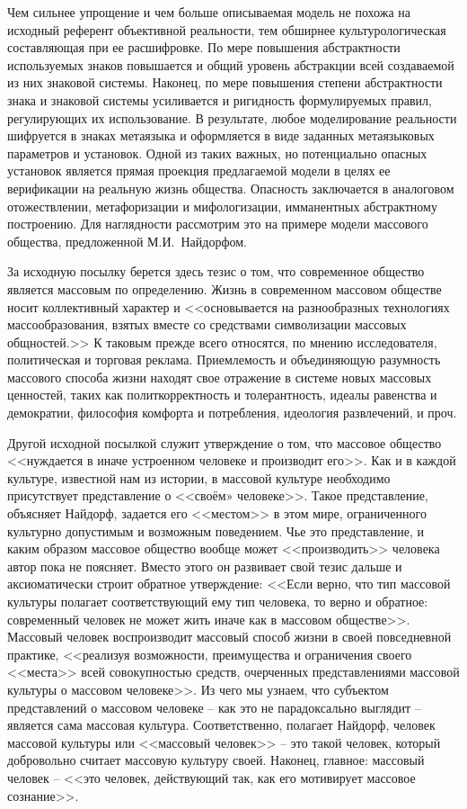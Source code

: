 Чем сильнее упрощение и чем больше описываемая модель не похожа на исходный референт объективной реальности,
тем обширнее культурологическая составляющая при ее расшифровке. По мере повышения абстрактности используемых
знаков повышается и общий уровень абстракции всей создаваемой из них знаковой системы. Наконец, по мере
повышения степени абстрактности знака и знаковой системы усиливается и ригидность формулируемых правил,
регулирующих их использование. В результате, любое моделирование реальности шифруется в знаках метаязыка и
оформляется в виде заданных метаязыковых параметров и установок. Одной из таких важных, но потенциально опасных
установок является прямая проекция предлагаемой модели в целях ее верификации на реальную жизнь общества.
Опасность заключается в аналоговом отожествлении, метафоризации и мифологизации, имманентных абстрактному
построению. Для наглядности рассмотрим это на примере модели массового общества, предложенной М.И.~Найдорфом\autocite{ocherki}.

За исходную посылку берется здесь тезис о том, что современное общество является массовым по определению.
Жизнь в современном массовом обществе носит коллективный характер и <<основывается на разнообразных технологиях
массообразования, взятых вместе со средствами символизации массовых общностей.>>\autocite{ocherki}
К таковым прежде всего относятся, по мнению исследователя, политическая и торговая реклама. Приемлемость
и объединяющую разумность массового способа жизни находят свое отражение в системе новых массовых
ценностей, таких как политкорректность и толерантность, идеалы равенства и демократии, философия комфорта
и потребления, идеология развлечений, и проч.

Другой исходной посылкой служит утверждение о том, что массовое общество <<нуждается в иначе устроенном
человеке и производит его>>. Как и в каждой культуре, известной нам из истории, в
массовой культуре необходимо присутствует представление о <<своём» человеке>>.\autocite{ocherki} Такое представление,
объясняет Найдорф, задается его <<местом>> в этом мире, ограниченного культурно допустимым и возможным поведением.\autocite{naydof}
Чье это представление, и каким образом массовое общество вообще может <<производить>>
человека автор пока не поясняет. Вместо этого он развивает свой тезис дальше и аксиоматически
строит обратное утверждение: <<Если верно, что тип массовой культуры полагает соответствующий ему тип человека,
то верно и обратное: современный человек не может жить иначе как в массовом обществе>>.\autocite{ocherki}
Массовый человек воспроизводит массовый способ жизни в своей повседневной практике, <<реализуя возможности,
преимущества и ограничения своего <<места>> всей совокупностью средств, очерченных представлениями массовой
культуры о массовом человеке>>.\autocite{ocherki} Из чего мы узнаем, что субъектом представлений о массовом человеке --
как это не парадоксально выглядит -- является сама массовая культура. Соответственно, полагает Найдорф,
человек массовой культуры или <<массовый человек>> -- это такой человек, который добровольно считает
массовую культуру своей. Наконец, главное: массовый человек -- <<это человек, действующий так, как его
мотивирует массовое сознание>>.\autocite{ocherki}

